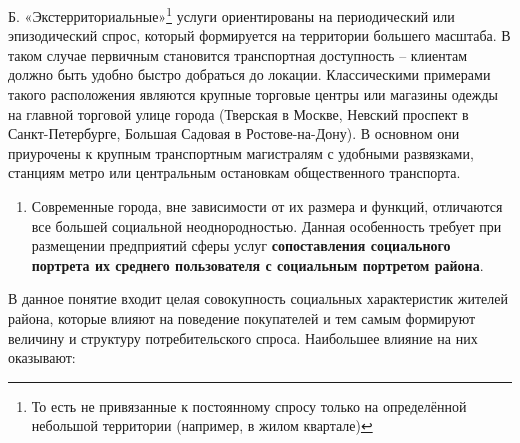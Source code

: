 \documentclass[
  11pt,
]{book}
\providecommand{\tightlist}{%
  \setlength{\itemsep}{0pt}\setlength{\parskip}{0pt}}
\begin{document}
Б. «Экстерриториальные»\footnote{То есть не привязанные к постоянному спросу только на определённой небольшой территории (например, в
  жилом квартале)} услуги ориентированы на периодический или эпизодический спрос, который
формируется на территории большего масштаба. В таком случае первичным становится транспортная доступность -- клиентам должно быть удобно быстро добраться до локации. Классическими примерами такого расположения являются крупные торговые центры или магазины одежды на главной торговой улице города (Тверская в Москве, Невский проспект в Санкт-Петербурге, Большая Садовая в
Ростове-на-Дону). В основном они приурочены к крупным транспортным магистралям с удобными развязками, станциям метро или центральным остановкам общественного транспорта.

\begin{enumerate}
\def\labelenumi{\arabic{enumi}.}
\setcounter{enumi}{1}
\tightlist
\item
  Современные города, вне зависимости от их размера и функций, отличаются все большей социальной неоднородностью.
  Данная особенность требует при размещении предприятий сферы услуг \textbf{сопоставления социального портрета их среднего пользователя с социальным портретом района}.
\end{enumerate}

В данное понятие входит целая совокупность социальных характеристик жителей района, которые влияют на
поведение покупателей и тем самым формируют величину и структуру потребительского спроса. Наибольшее влияние на них оказывают:
\end{document}
